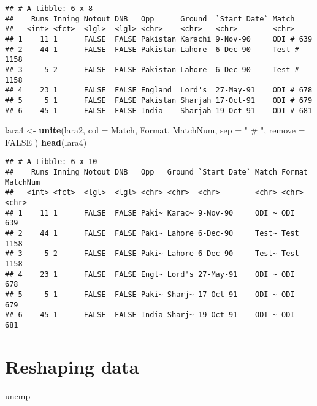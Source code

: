 \documentclass[]{book}
\newenvironment{Shaded}{\begin{snugshade}}{\end{snugshade}}
\newcommand{\DataTypeTok}[1]{\textcolor[rgb]{0.13,0.29,0.53}{#1}}
\newcommand{\KeywordTok}[1]{\textcolor[rgb]{0.13,0.29,0.53}{\textbf{#1}}}
\newcommand{\NormalTok}[1]{#1}
\newcommand{\OtherTok}[1]{\textcolor[rgb]{0.56,0.35,0.01}{#1}}
\newcommand{\StringTok}[1]{\textcolor[rgb]{0.31,0.60,0.02}{#1}}
\begin{document}
\begin{verbatim}
## # A tibble: 6 x 8
##    Runs Inning Notout DNB   Opp      Ground  `Start Date` Match      
##   <int> <fct>  <lgl>  <lgl> <chr>    <chr>   <chr>        <chr>      
## 1    11 1      FALSE  FALSE Pakistan Karachi 9-Nov-90     ODI # 639  
## 2    44 1      FALSE  FALSE Pakistan Lahore  6-Dec-90     Test # 1158
## 3     5 2      FALSE  FALSE Pakistan Lahore  6-Dec-90     Test # 1158
## 4    23 1      FALSE  FALSE England  Lord's  27-May-91    ODI # 678  
## 5     5 1      FALSE  FALSE Pakistan Sharjah 17-Oct-91    ODI # 679  
## 6    45 1      FALSE  FALSE India    Sharjah 19-Oct-91    ODI # 681
\end{verbatim}

\begin{Shaded}
\begin{Highlighting}[]
\NormalTok{lara4 <-}\StringTok{ }\KeywordTok{unite}\NormalTok{(lara2, }\DataTypeTok{col =}\NormalTok{ Match, Format, MatchNum, }\DataTypeTok{sep =} \StringTok{" # "}\NormalTok{, }\DataTypeTok{remove =} \OtherTok{FALSE}\NormalTok{ )}
\KeywordTok{head}\NormalTok{(lara4)}
\end{Highlighting}
\end{Shaded}

\begin{verbatim}
## # A tibble: 6 x 10
##    Runs Inning Notout DNB   Opp   Ground `Start Date` Match Format MatchNum
##   <int> <fct>  <lgl>  <lgl> <chr> <chr>  <chr>        <chr> <chr>  <chr>   
## 1    11 1      FALSE  FALSE Paki~ Karac~ 9-Nov-90     ODI ~ ODI    639     
## 2    44 1      FALSE  FALSE Paki~ Lahore 6-Dec-90     Test~ Test   1158    
## 3     5 2      FALSE  FALSE Paki~ Lahore 6-Dec-90     Test~ Test   1158    
## 4    23 1      FALSE  FALSE Engl~ Lord's 27-May-91    ODI ~ ODI    678     
## 5     5 1      FALSE  FALSE Paki~ Sharj~ 17-Oct-91    ODI ~ ODI    679     
## 6    45 1      FALSE  FALSE India Sharj~ 19-Oct-91    ODI ~ ODI    681
\end{verbatim}

\hypertarget{widelong}{%
\section*{Reshaping data}\label{widelong}}

\begin{Shaded}
\begin{Highlighting}[]
\NormalTok{unemp}
\end{Highlighting}
\end{Shaded}
\end{document}
